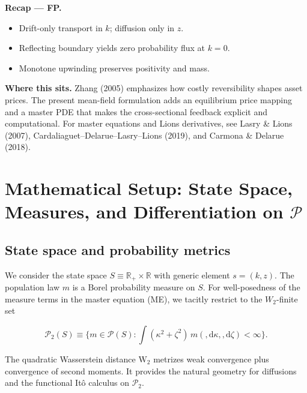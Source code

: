 ﻿\documentclass[11pt,letterpaper,oneside]{article}
\numberwithin{equation}{section}
\newcommand{\R}{\mathbb{R}}
\newcommand{\1}{\mathbf{1}}
\newcommand{\diff}{,\mathrm{d}}
\begin{document}
\begin{tcolorbox}[didacticstyle]
\textbf{Recap --- FP.}
\begin{itemize}[leftmargin=1.15em,itemsep=0.2em]
  \item Drift-only transport in $k$; diffusion only in $z$.
  \item Reflecting boundary yields zero probability flux at $k=0$.
  \item Monotone upwinding preserves positivity and mass.
\end{itemize}
\end{tcolorbox}

\begin{tcolorbox}[literaturestyle]
\textbf{Where this sits.} Zhang (2005) emphasizes how costly reversibility shapes asset prices. The present mean-field formulation adds an equilibrium price mapping and a master PDE that makes the cross-sectional feedback explicit and computational. For master equations and Lions derivatives, see Lasry \& Lions (2007), Cardaliaguet--Delarue--Lasry--Lions (2019), and Carmona \& Delarue (2018).
\end{tcolorbox}


\section{Mathematical Setup: State Space, Measures, and Differentiation on \texorpdfstring{$\mathcal P$}{P}}\label{sec:math-setup}

\subsection{State space and probability metrics}\label{sec:state-metrics}
We consider the state space $S\equiv \R_+\times\R$ with generic element $s=(k,z)$. The population law $m$ is a Borel probability measure on $S$. For well-posedness of the measure terms in the master equation (ME), we tacitly restrict to the $W_2$-finite set

$$
\mathcal P_2(S)\equiv\Big\{ m\in\mathcal P(S): \int (\kappa^2 + \zeta^2)\, m(\diff\kappa,\diff\zeta) < \infty\Big\}.
$$

The quadratic Wasserstein distance $\mathrm{W}_2$ metrizes weak convergence plus convergence of second moments. It provides the natural geometry for diffusions and the functional Itô calculus on $\mathcal P_2$.
\end{document}
